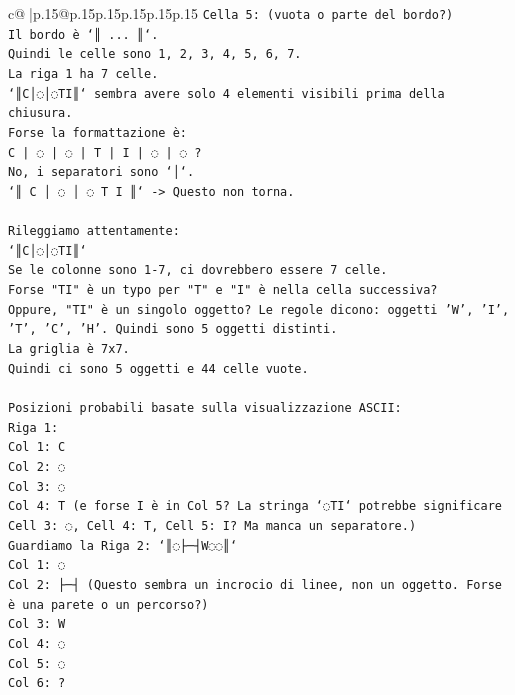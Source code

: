 \documentclass{article}
\begin{document}
{\begin{supertabular}{c@{$\;$}|p{.15\linewidth}@{}p{.15\linewidth}p{.15\linewidth}p{.15\linewidth}p{.15\linewidth}p{.15\linewidth}}
{{{\texttt{Cella 5: (vuota o parte del bordo?)} \\
\texttt{Il bordo è `║ ... ║`.} \\
\texttt{Quindi le celle sono 1, 2, 3, 4, 5, 6, 7.} \\
\texttt{La riga 1 ha 7 celle.} \\
\texttt{`║C│◌│◌TI║` sembra avere solo 4 elementi visibili prima della chiusura.} \\
\texttt{Forse la formattazione è:} \\
\texttt{C | ◌ | ◌ | T | I | ◌ | ◌ ?} \\
\texttt{No, i separatori sono `│`.} \\
\texttt{`║ C │ ◌ │ ◌ T I ║` {-}> Questo non torna.} \\
\\ 
\texttt{Rileggiamo attentamente:} \\
\texttt{`║C│◌│◌TI║`} \\
\texttt{Se le colonne sono 1{-}7, ci dovrebbero essere 7 celle.} \\
\texttt{Forse "TI" è un typo per "T" e "I" è nella cella successiva?} \\
\texttt{Oppure, "TI" è un singolo oggetto? Le regole dicono: oggetti 'W', 'I', 'T', 'C', 'H'. Quindi sono 5 oggetti distinti.} \\
\texttt{La griglia è 7x7.} \\
\texttt{Quindi ci sono 5 oggetti e 44 celle vuote.} \\
\\ 
\texttt{Posizioni probabili basate sulla visualizzazione ASCII:} \\
\texttt{Riga 1:} \\
\texttt{Col 1: C} \\
\texttt{Col 2: ◌} \\
\texttt{Col 3: ◌} \\
\texttt{Col 4: T (e forse I è in Col 5? La stringa `◌TI` potrebbe significare Cell 3: ◌, Cell 4: T, Cell 5: I? Ma manca un separatore.)} \\
\texttt{Guardiamo la Riga 2: `║◌├─┤W◌◌║`} \\
\texttt{Col 1: ◌} \\
\texttt{Col 2: ├─┤ (Questo sembra un incrocio di linee, non un oggetto. Forse è una parete o un percorso?)} \\
\texttt{Col 3: W} \\
\texttt{Col 4: ◌} \\
\texttt{Col 5: ◌} \\
\texttt{Col 6: ?} \\
}}}
\end{supertabular}}
\end{document}
